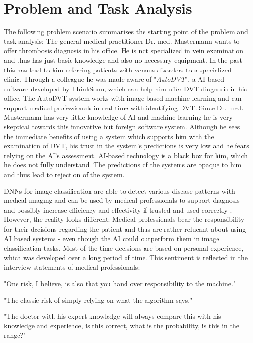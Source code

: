 \documentclass[11pt,a4paper,english]{scrreprt}
\begin{document}
\section{Problem and Task Analysis}
The following problem scenario summarizes the starting point of the problem and task analysis: The general medical practitioner Dr. med. Mustermann wants to offer thrombosis diagnosis in his office. He is not specialized in vein examination and thus has just basic knowledge and also no necessary equipment. In the past this has lead to him referring patients with venous disorders to a specialized clinic. Through a colleague he was made aware of "\textit{AutoDVT}", a AI-based software developed by ThinkSono, which can help him offer DVT diagnosis in his office. The AutoDVT system works with image-based machine learning and can support medical professionals in real time with identifying DVT. Since Dr. med. Mustermann has very little knowledge of AI and machine learning he is very skeptical towards this innovative but foreign software system. Although he sees the immediate benefits of using a system which supports him with the examination of DVT, his trust in the system’s predictions is very low and he fears relying on the AI’s assessment. AI-based technology is a black box for him, which he does not fully understand. The predictions of the systems are opaque to him and thus lead to rejection of the system.

DNNs for image classification are able to detect various disease patterns with medical imaging and can be used by medical professionals to support diagnosis and possibly increase efficiency and effectivity if trusted and used correctly \parencite{adadi_blackbox_2018,knapic_explainable_2021}. However, the reality looks different: Medical professionals bear the responsibility for their decisions regarding the patient and thus are rather relucant about using AI based systems - even though the AI could outperform them in image classification tasks. Most of the time decisions are based on personal experience, which was developed over a long period of time. This sentiment is reflected in the interview statements of medical professionals:
\begin{displayquote}
    "One risk, I believe, is also that you hand over responsibility to the machine."
\end{displayquote}
\begin{displayquote}
    "The classic risk of simply relying on what the algorithm says."
\end{displayquote}
\begin{displayquote}
    "The doctor with his expert knowledge will always compare this with his knowledge and experience, is this correct, what is the probability, is this in the range?"
\end{displayquote}
\end{document}
